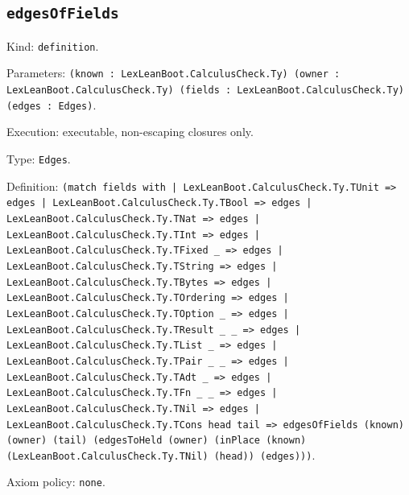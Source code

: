 \documentclass[11pt]{article}
\begin{document}
\subsection*{\texttt{edgesOfFields}}
\noindent Kind: \texttt{definition}.\par
\noindent Parameters: \texttt{(known : LexLeanBoot.CalculusCheck.Ty) (owner : LexLeanBoot.CalculusCheck.Ty) (fields : LexLeanBoot.CalculusCheck.Ty) (edges : Edges)}.\par
\noindent Execution: executable, non-escaping closures only.\par
\noindent Type: \texttt{Edges}.\par
\noindent Definition: \texttt{(match fields with | LexLeanBoot.CalculusCheck.Ty.TUnit => edges | LexLeanBoot.CalculusCheck.Ty.TBool => edges | LexLeanBoot.CalculusCheck.Ty.TNat => edges | LexLeanBoot.CalculusCheck.Ty.TInt => edges | LexLeanBoot.CalculusCheck.Ty.TFixed \_ => edges | LexLeanBoot.CalculusCheck.Ty.TString => edges | LexLeanBoot.CalculusCheck.Ty.TBytes => edges | LexLeanBoot.CalculusCheck.Ty.TOrdering => edges | LexLeanBoot.CalculusCheck.Ty.TOption \_ => edges | LexLeanBoot.CalculusCheck.Ty.TResult \_ \_ => edges | LexLeanBoot.CalculusCheck.Ty.TList \_ => edges | LexLeanBoot.CalculusCheck.Ty.TPair \_ \_ => edges | LexLeanBoot.CalculusCheck.Ty.TAdt \_ => edges | LexLeanBoot.CalculusCheck.Ty.TFn \_ \_ => edges | LexLeanBoot.CalculusCheck.Ty.TNil => edges | LexLeanBoot.CalculusCheck.Ty.TCons head tail => edgesOfFields (known) (owner) (tail) (edgesToHeld (owner) (inPlace (known) (LexLeanBoot.CalculusCheck.Ty.TNil) (head)) (edges)))}.\par
\noindent Axiom policy: \texttt{none}.\par
\end{document}
